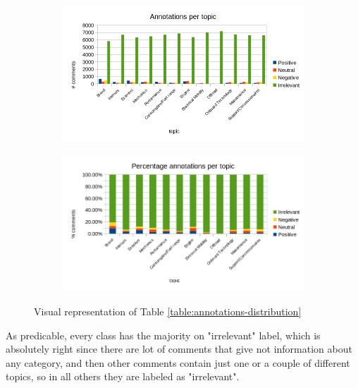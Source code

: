 \begin{figure}[ht]
	\centering
	\begin{subfigure}{1\textwidth} %
		\includegraphics[width=1\textwidth]{figures/charts/annotations-distribution.png}
		\label{fig:annotations-distribution}
	\end{subfigure}
	\begin{subfigure}{1\textwidth} %
		\includegraphics[width=1\textwidth]{figures/charts/annotations-distribution-perc.png}
		\label{fig:annotations-distribution-perc}
	\end{subfigure}
	\caption{Visual representation of Table \ref{table:annotations-distribution}} %
	\label{fig:annotations}
\end{figure}


As predicable, every class has the majority on "irrelevant" label, which is absolutely right since there are lot of comments that give not information about any category, and then other comments contain just one or a couple of different topics, so in all others they are labeled as "irrelevant".







